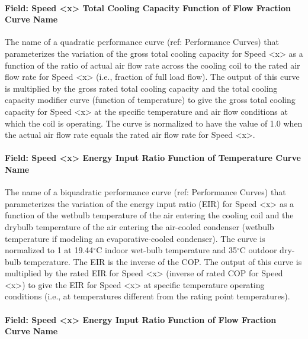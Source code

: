 \paragraph{Field: Speed \textless{}x\textgreater{} Total Cooling Capacity Function of Flow Fraction Curve Name}\label{field-speed-x-total-cooling-capacity-function-of-flow-fraction-curve-name}

The name of a quadratic performance curve (ref: Performance Curves) that parameterizes the variation of the gross total cooling capacity for Speed \textless{}x\textgreater{} as a function of the ratio of actual air flow rate across the cooling coil to the rated air flow rate for Speed \textless{}x\textgreater{} (i.e., fraction of full load flow). The output of this curve is multiplied by the gross rated total cooling capacity and the total cooling capacity modifier curve (function of temperature) to give the gross total cooling capacity for Speed \textless{}x\textgreater{} at the specific temperature and air flow conditions at which the coil is operating. The curve is normalized to have the value of 1.0 when the actual air flow rate equals the rated air flow rate for Speed \textless{}x\textgreater{}.

\paragraph{Field: Speed \textless{}x\textgreater{} Energy Input Ratio Function of Temperature Curve Name}\label{field-speed-x-energy-input-ratio-function-of-temperature-curve-name}

The name of a biquadratic performance curve (ref: Performance Curves) that parameterizes the variation of the energy input ratio (EIR) for Speed \textless{}x\textgreater{} as a function of the wetbulb temperature of the air entering the cooling coil and the drybulb temperature of the air entering the air-cooled condenser (wetbulb temperature if modeling an evaporative-cooled condenser). The curve is normalized to 1 at 19.44$^\circ$C indoor wet-bulb temperature and 35$^\circ$C outdoor dry-bulb temperature. The EIR is the inverse of the COP. The output of this curve is multiplied by the rated EIR for Speed \textless{}x\textgreater{} (inverse of rated COP for Speed \textless{}x\textgreater{}) to give the EIR for Speed \textless{}x\textgreater{} at specific temperature operating conditions (i.e., at temperatures different from the rating point temperatures).

\paragraph{Field: Speed \textless{}x\textgreater{} Energy Input Ratio Function of Flow Fraction Curve Name}\label{field-speed-x-energy-input-ratio-function-of-flow-fraction-curve-name}

